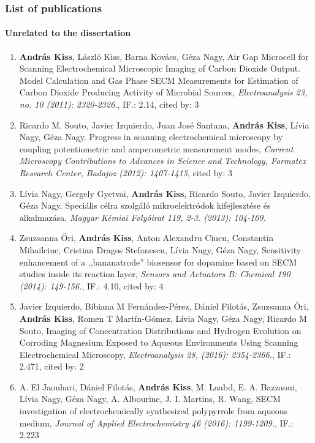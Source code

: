 \documentclass{beamer}
\begin{document}
\begin{frame}
\frametitle{List of publications}
\framesubtitle{Unrelated to the dissertation}
\tiny
\begin{enumerate}
\item \textbf{András Kiss}, László Kiss, Barna Kovács, Géza Nagy, Air Gap Microcell for Scanning Electrochemical Microscopic Imaging of Carbon Dioxide Output. Model Calculation and Gas Phase SECM Measurements for Estimation of Carbon Dioxide Producing Activity of Microbial Sources, \emph{Electroanalysis 23, no. 10 (2011): 2320-2326.}, IF.: 2.14, cited by: 3

\item Ricardo M. Souto, Javier Izquierdo, Juan José Santana, \textbf{András Kiss}, Lívia Nagy, Géza Nagy. Progress in scanning electrochemical microscopy by coupling potentiometric and amperometric measurement modes, \emph{Current Microscopy Contributions to Advances in Science and Technology, Formatex Research Center, Badajoz (2012): 1407-1415}, cited by: 3

\item Lívia Nagy, Gergely Gyetvai, \textbf{András Kiss}, Ricardo Souto, Javier Izquierdo, Géza Nagy, Speciális célra szolgáló mikroelektródok kifejlesztése és alkalmazása, \emph{Magyar Kémiai Folyóirat 119, 2-3. (2013): 104-109.}

\item Zsuzsanna \H{O}ri, \textbf{András Kiss}, Anton Alexandru Ciucu, Constantin Mihailciuc, Cristian Dragos Stefanescu, Lívia Nagy, Géza Nagy, Sensitivity enhancement of a ,,bananatrode'' biosensor for dopamine based on SECM studies inside its reaction layer, \emph{Sensors and Actuators B: Chemical 190 (2014): 149-156.}, IF.: 4.10, cited by: 4

\item Javier Izquierdo, Bibiana M Fernández-Pérez, Dániel Filotás, Zsuzsanna Őri, \textbf{András Kiss}, Romen T Martín-Gómez, Lívia Nagy, Géza Nagy, Ricardo M Souto, Imaging of Concentration Distributions and Hydrogen Evolution on Corroding Magnesium Exposed to Aqueous Environments Using Scanning Electrochemical Microscopy, \emph{Electroanalysis 28, (2016): 2354-2366.}, IF.: 2.471, cited by: 2

\item A. El Jaouhari,  Dániel Filotás, \textbf{András Kiss}, M. Laabd, E. A. Bazzaoui, Lívia Nagy, Géza Nagy, A. Albourine, J. I. Martins, R. Wang, SECM investigation of electrochemically synthesized polypyrrole from aqueous medium, \emph{Journal of Applied Electrochemistry 46 (2016): 1199-1209.}, IF.: 2.223
\end{enumerate}
\end{frame}
\end{document}
